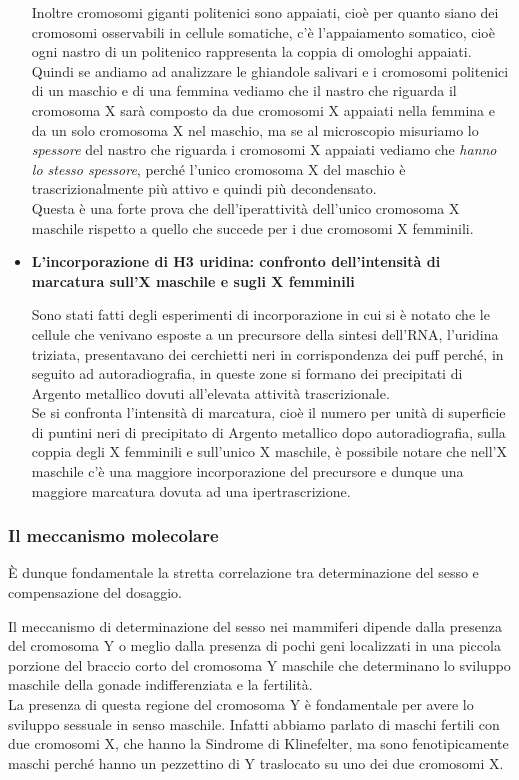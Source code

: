 \documentclass[11pt]{book}
\begin{document}
\begin{itemize}
Inoltre cromosomi giganti politenici sono appaiati, cioè per quanto siano dei cromosomi osservabili in cellule somatiche, c’è l’appaiamento somatico, cioè ogni nastro di un politenico rappresenta la coppia di omologhi appaiati. Quindi se andiamo ad analizzare le ghiandole salivari e i cromosomi politenici di un maschio e di una femmina vediamo che il nastro che riguarda il cromosoma X sarà composto da due cromosomi X appaiati nella femmina e da un solo cromosoma X nel maschio, ma se al microscopio misuriamo lo \emph{spessore} del nastro che riguarda i cromosomi X appaiati vediamo che \emph{hanno lo stesso spessore}, perché l’unico cromosoma X del maschio è trascrizionalmente più attivo e quindi più decondensato.\\
Questa è una forte prova che dell’iperattività dell’unico cromosoma X maschile rispetto a quello che succede per i due cromosomi X femminili.

\item \textbf{L'incorporazione di H3 uridina: confronto dell’intensità di marcatura sull’X maschile e sugli X femminili} 

Sono stati fatti degli esperimenti di incorporazione in cui si è notato che le cellule che venivano esposte a un precursore della sintesi dell’RNA, l’uridina triziata, presentavano dei cerchietti neri in corrispondenza dei puff perché, in seguito ad autoradiografia, in queste zone si formano dei precipitati di Argento metallico dovuti all’elevata attività trascrizionale.\\
Se si confronta l’intensità di marcatura, cioè il numero per unità di superficie di puntini neri di precipitato di Argento metallico dopo autoradiografia, sulla coppia degli X femminili e sull’unico X maschile, è possibile notare che nell’X maschile c’è una maggiore incorporazione del precursore e dunque una maggiore marcatura dovuta ad una ipertrascrizione.
\end{itemize}

\subsubsection{Il meccanismo molecolare}
È dunque fondamentale la stretta correlazione tra determinazione del sesso e compensazione del dosaggio.

Il meccanismo di determinazione del sesso nei mammiferi dipende dalla presenza del cromosoma Y o meglio dalla presenza di pochi geni localizzati in una piccola porzione del braccio corto del cromosoma Y maschile che determinano lo sviluppo maschile della gonade indifferenziata e la fertilità.\\
La presenza di questa regione del cromosoma Y è fondamentale per avere lo sviluppo sessuale in senso maschile. Infatti abbiamo parlato di maschi fertili con due cromosomi X, che hanno la Sindrome di Klinefelter, ma sono fenotipicamente maschi perché hanno un pezzettino di Y traslocato su uno dei due cromosomi X.
\end{document}
